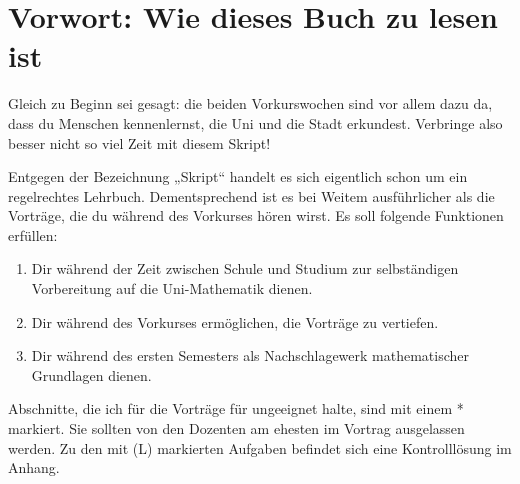 

\chapter{Vorwort: Wie dieses Buch zu lesen ist}

Gleich zu Beginn sei gesagt: die beiden Vorkurswochen sind vor allem dazu da, dass du Menschen kennenlernst, die Uni und die Stadt erkundest. Verbringe also besser nicht so viel Zeit mit diesem Skript!

Entgegen der Bezeichnung „Skript“ handelt es sich eigentlich schon um ein regelrechtes Lehrbuch. Dementsprechend ist es bei Weitem ausführlicher als die Vorträge, die du während des Vorkurses hören wirst. Es soll folgende Funktionen erfüllen:
\begin{enumerate}[1.]
    \item Dir während der Zeit zwischen Schule und Studium zur selbständigen Vorbereitung auf die Uni-Mathematik dienen.
    \item Dir während des Vorkurses ermöglichen, die Vorträge zu vertiefen.
    \item Dir während des ersten Semesters als Nachschlagewerk mathematischer Grundlagen dienen.
\end{enumerate}
Abschnitte, die ich für die Vorträge für ungeeignet halte, sind mit einem * markiert. Sie sollten von den Dozenten am ehesten im Vortrag ausgelassen werden. Zu den mit (L) markierten Aufgaben befindet sich eine Kontrolllösung im Anhang.

